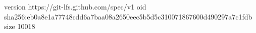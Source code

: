 version https://git-lfs.github.com/spec/v1
oid sha256:eb0a8e1a77748cdd6a7baa08a2650eec5b5d5c310071867600d490297a7c1fdb
size 10018
